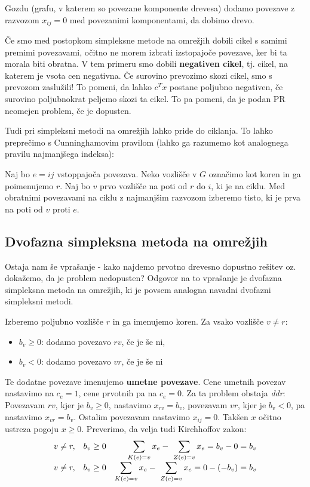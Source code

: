 \documentclass[11pt, a4paper]{article}
\begin{document}
    \begin{remark}
        Gozdu (grafu, v katerem so povezane komponente drevesa) dodamo povezave z razvozom \(x_{ij} = 0\) med povezanimi komponentami, da dobimo drevo.
    \end{remark}

    Če smo med postopkom simpleksne metode na omrežjih dobili cikel s samimi premimi povezavami, očitno ne morem izbrati izstopajoče povezave, ker bi ta morala biti obratna. V tem primeru smo dobili \textbf{negativen cikel}, tj. cikel, na katerem je vsota cen negativna. Če surovino prevozimo skozi cikel, smo s prevozom zaslužili! To pomeni, da lahko \(c^T x\) postane poljubno negativen, če surovino poljubnokrat peljemo skozi ta cikel. To pa pomeni, da je podan PR neomejen problem, če je dopusten.

    \par
    Tudi pri simpleksni metodi na omrežjih lahko pride do ciklanja. To lahko preprečimo s Cunninghamovim pravilom (lahko ga razumemo kot analognega pravilu najmanjšega indeksa):
    \par
    Naj bo \(e = ij\) vstoppajoča povezava. Neko vozlišče v \(G\) označimo kot koren in ga poimenujemo \(r\). Naj bo \(v\) prvo vozlišče na poti od \(r\) do \(i\), ki je na ciklu. Med obratnimi povezavami na ciklu z najmanjšim razvozom izberemo tisto, ki je prva na poti od \(v\) proti \(e\).

    \subsection{Dvofazna simpleksna metoda na omrežjih}

    Ostaja nam še vprašanje - kako najdemo prvotno drevesno dopustno rešitev oz. dokažemo, da je problem nedopusten? Odgovor na to vprašanje je dvofazna simpleksna metoda na omrežjih, ki je povsem analogna navadni dvofazni simpleksni metodi.
    \par
    Izberemo poljubno vozlišče \(r\) in ga imenujemo koren. Za vsako vozlišče \(v \neq r\):
    \begin{itemize}
        \item \(b_v \ge 0\): dodamo povezavo \(rv\), če je še ni,
        \item \(b_v < 0\): dodamo povezavo \(vr\), če je še ni
    \end{itemize}

    Te dodatne povezave imenujemo \textbf{umetne povezave}. Cene umetnih povezav nastavimo na \(c_e=1\), cene prvotnih pa na \(c_e=0\). Za ta problem obstaja \textit{ddr}: Povezavam \(rv\), kjer je \(b_v \ge 0\), nastavimo \(x_{rv}=b_v\), povezavam \(vr\), kjer je \(b_v < 0\), pa nastavimo \(x_{vr}=b_v\). Ostalim povezavam nastavimo \(x_{ij}=0\). Takšen \(x\) očitno ustreza pogoju \(x \ge 0\). Preverimo, da velja tudi Kirchhoffov zakon:
    \[
        \begin{array}{l l r}
            v \neq r, & b_v \ge 0 & \displaystyle \sum_{K(e)=v} x_e -\ \sum_{Z(e)=v} x_e = b_v - 0 = b_v \\
            v \neq r, & b_v \ge 0 & \displaystyle \sum_{K(e)=v} x_e -\ \sum_{Z(e)=v} x_e = 0 - (-b_v) = b_v \\
        \end{array}
    \]
\end{document}

